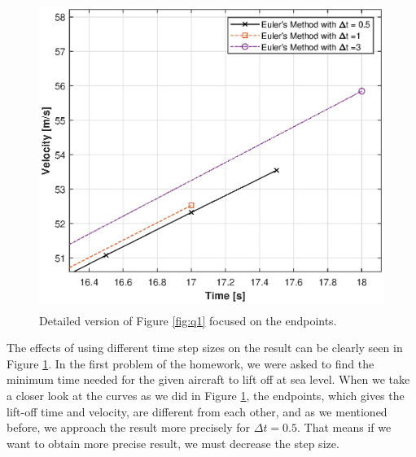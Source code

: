 \documentclass[letterpaper,12pt]{article}
\begin{document}
\newpage
\begin{figure}[ht]
        \centering \includegraphics[max height=10cm]{graphs/question1_finaltime.eps}
        \caption{Detailed version of Figure \ref{fig:q1} focused on the endpoints.}
        \label{fig:q1_closer}
\end{figure}

 The effects of using different time step sizes on the result can be clearly seen in Figure \ref{fig:q1_closer}.
 In the first problem of the homework, we were asked to find the minimum time needed for the given aircraft to
 lift off at sea level. When we take a closer look at the curves as we did in Figure \ref{fig:q1_closer}, the
 endpoints, which gives the lift-off time and velocity, are different from each other, and as we mentioned 
 before, we approach the result more precisely for $ \Delta t = 0.5 $. That means if we want to obtain more precise result, 
 we must decrease the step size.
\newpage
\end{document}
